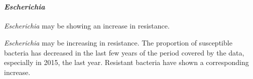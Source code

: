 \documentclass[11pt]{article}
\begin{document}
    \begin{center}
    \end{center}
    { \hspace*{\fill} \\}
    
    \hypertarget{escherichia}{%
\paragraph{\texorpdfstring{\emph{Escherichia}}{Escherichia}}\label{escherichia}}

    \emph{Escherichia} may be showing an increase in resistance.

\emph{Escherichia} may be increasing in resistance. The proportion of
susceptible bacteria has decreased in the last few years of the period
covered by the data, especially in 2015, the last year. Resistant
bacteria have shown a corresponding increase.
\end{document}
